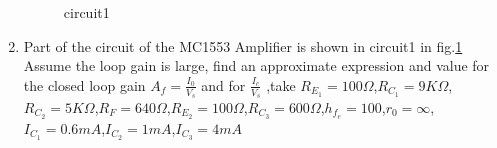 \begin{enumerate}[label=\thesubsection.\arabic*.,ref=\thesubsection.\theenumi]

\begin{figure}[!ht]
	\begin{center}
		
		\resizebox{\columnwidth}{!}{}
	\end{center}
\caption{circuit1}
\label{fig:circuit1}
\end{figure}

\item

 Part of the circuit of the MC1553 Amplifier is shown in circuit1 in  fig.\ref{fig:circuit1} Assume the loop gain is large, find an approximate expression and value for the closed loop gain $A_f=\frac{I_0}{V_s}$ and  for $\frac{I_c}{V_s}$ ,take {\small $R_E_1=100\Omega$,$R_C_1=9K\Omega$,$R_C_2=5K\Omega$,$R_F=640\Omega$,$R_E_2=100\Omega$,$R_C_3=600\Omega$,$h_f_e=100$,$r_0=\infty$,$I_C_1=0.6mA$,$I_C_2=1mA$,$I_C_3=4mA$
}%
 
\begin{figure}[!ht]
	\begin{center}
		

\end{center}
\end{figure}
\end{enumerate}
